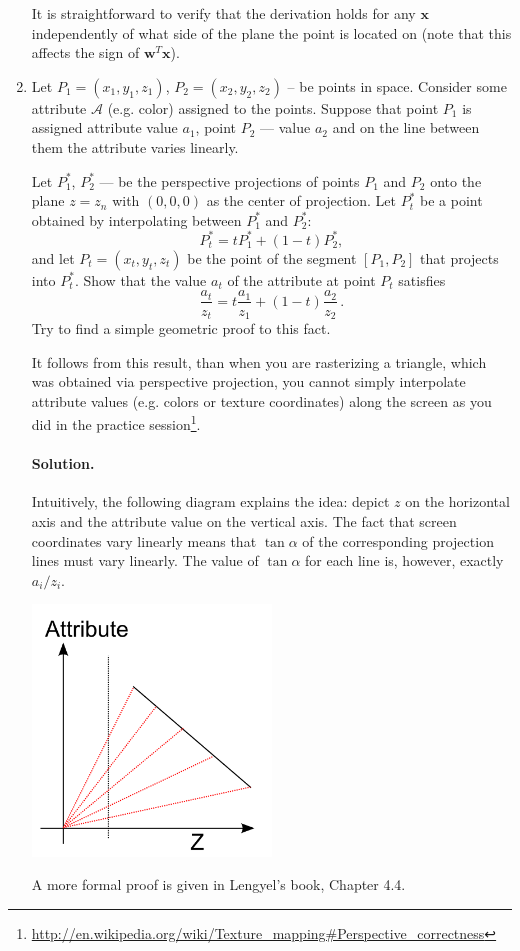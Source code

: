 \documentclass{article}
\newcommand{\bw}{\mathbf{w}}
\newcommand{\bx}{\mathbf{x}}
\begin{document}
\begin{enumerate}
It is straightforward to verify that the derivation holds for any $\bx$ independently of what side of the plane the point is located on (note that this affects the sign of $\bw^T\bx$).

\item Let $P_1 = (x_1, y_1, z_1)$, $P_2 = (x_2, y_2, z_2)$ -- be points in space. Consider some attribute $\mathcal{A}$ (e.g. color) assigned to the points. Suppose that point $P_1$ is assigned attribute value $a_1$, point $P_2$ --- value $a_2$ and on the line between them the attribute varies linearly.

Let $P_1^*$, $P_2^*$ --- be the perspective projections of points $P_1$ and $P_2$ onto the plane $z = z_n$ with $(0, 0, 0)$ as the center of projection.
Let $P_t^*$ be a point obtained by interpolating between $P_1^*$ and $P_2^*$: 
$$P_t^* = tP_1^* + (1-t)P_2^*,$$
and let $P_t = (x_t, y_t, z_t)$ be the point of the segment $[P_1, P_2]$ that projects into $P_t^*$. Show that the value $a_t$ of the attribute at point $P_t$ satisfies
\[ \frac{a_t}{z_t} = t \frac{a_1}{z_1} + (1-t)\frac{a_2}{z_2}\, .\]
Try to find a simple geometric proof to this fact.

It follows from this result, than when you are rasterizing a triangle, which was obtained via perspective projection, you cannot simply interpolate attribute values (e.g. colors or texture coordinates) along the screen as you did in the practice session\footnote{\url{http://en.wikipedia.org/wiki/Texture_mapping\#Perspective_correctness}}.

\paragraph{Solution.}
Intuitively, the following diagram explains the idea: depict $z$ on the horizontal axis and the attribute value on the vertical axis. The fact that screen coordinates vary linearly means that $\tan \alpha$ of the corresponding projection lines must vary linearly. The value of $\tan \alpha$ for each line is, however, exactly $a_i/z_i$.

\begin{center}
\includegraphics[width=0.5\textwidth]{interpolation1.png}
\end{center}

A more formal proof is given in Lengyel's book, Chapter 4.4.
\end{enumerate}
\end{document}
